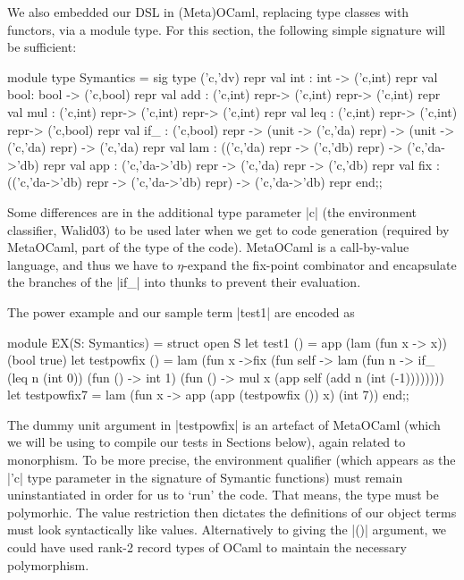 \documentclass[preprint]{sigplanconf}
\begin{document}
We also embedded our DSL in (Meta)OCaml, replacing type classes with
functors, via a module type.  For this section, the following simple
signature will be sufficient:

\begin{code}
module type Symantics = sig
  type ('c,'dv) repr
  val int : int  -> ('c,int) repr
  val bool: bool -> ('c,bool) repr
  val add : ('c,int) repr-> ('c,int) repr-> ('c,int) repr
  val mul : ('c,int) repr-> ('c,int) repr-> ('c,int) repr
  val leq : ('c,int) repr-> ('c,int) repr-> ('c,bool) repr
  val if_ : ('c,bool) repr ->
             (unit -> ('c,'da) repr) ->
             (unit -> ('c,'da) repr) -> ('c,'da) repr 
  val lam : (('c,'da) repr -> ('c,'db) repr) 
          -> ('c,'da->'db) repr
  val app : ('c,'da->'db) repr
    -> ('c,'da) repr -> ('c,'db) repr
  val fix : (('c,'da->'db) repr -> ('c,'da->'db) repr) 
            -> ('c,'da->'db) repr
end;;
\end{code}

Some differences are in the additional type parameter |c| (the
environment classifier, Walid03) to be used later when we get to code
generation (required by MetaOCaml, part of the type of the
code). MetaOCaml is a call-by-value language, and thus we have to 
$\eta$-expand
the fix-point combinator and encapsulate the branches of the |if_|
into thunks to prevent their evaluation. 

The power example and our sample term |test1| are encoded as
\begin{code}
module EX(S: Symantics) = struct
 open S
 let test1 () = app (lam (fun x -> x)) (bool true)
 let testpowfix () = 
   lam (fun x ->fix (fun self -> lam (fun n ->
     if_ (leq n (int 0)) (fun () -> int 1)
         (fun () -> mul x (app self 
                               (add n (int (-1))))))))
 let testpowfix7 = 
    lam (fun x -> app (app (testpowfix ()) x) (int 7))
end;;
\end{code}
The dummy unit argument in |testpowfix| is an artefact of MetaOCaml
(which we will be using to compile our tests in Sections below),
again related to monorphism. To be
more precise, the environment qualifier (which appears as the |'c|
type parameter in the signature of Symantic functions) must remain
uninstantiated in order for us to `run' the code. That means, the type
must be polymorhic. The value restriction then dictates 
the definitions of our object terms must look syntactically like
values. Alternatively to giving the |()| argument, we could have used
rank-2 record types of OCaml to maintain the necessary polymorphism.
\end{document}
